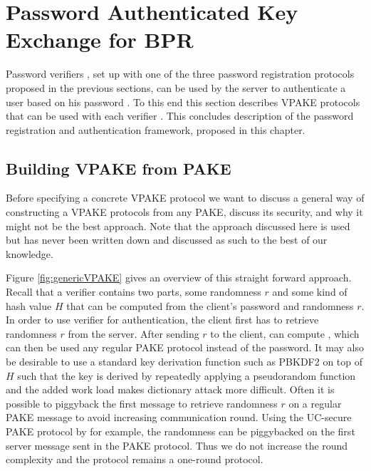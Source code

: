 \section{Password Authenticated Key Exchange for BPR}\label{sec:pake}

Password verifiers \ver, set up with one of the three password registration protocols proposed in the previous sections, can be used by the server to authenticate a user based on his password \pwd.
To this end this section describes \ac{VPAKE} protocols that can be used with each verifier \ver.
This concludes description of the password registration and authentication framework, proposed in this chapter.


\subsection{Building VPAKE from PAKE} \label{sec:vpakeToPake}
Before specifying a concrete \ac{VPAKE} protocol we want to discuss a general way of constructing a \ac{VPAKE} protocols from any \ac{PAKE}, discuss its security, and why it might not be the best approach.
Note that the approach discussed here is used but has never been written down and discussed as such to the best of our knowledge.

Figure \ref{fig:genericVPAKE} gives an overview of this straight forward approach.
Recall that a verifier \ver contains two parts, some randomness $r$ and some kind of hash value $H$ that can be computed from the client's password \pwd and randomness $r$.
In order to use verifier \ver for authentication, the client first has to retrieve randomness $r$ from the server.
After sending $r$ to the client, \Client can compute \ver, which can then be used any regular \ac{PAKE} protocol instead of the password.
It may also be desirable to use a standard key derivation function such as PBKDF2 \cite{rfc2898} on top of $H$ such that the key is derived by repeatedly applying a pseudorandom function and the added work load makes dictionary attack more difficult.
Often it is possible to piggyback the first message to retrieve randomness $r$ on a regular \ac{PAKE} message to avoid increasing communication round. 
Using the UC-secure \ac{PAKE} protocol by \citet{Benhamouda2013} for example, the randomness can be piggybacked on the first server message sent in the \ac{PAKE} protocol. 
Thus we do not increase the round complexity and the protocol remains a one-round protocol.

